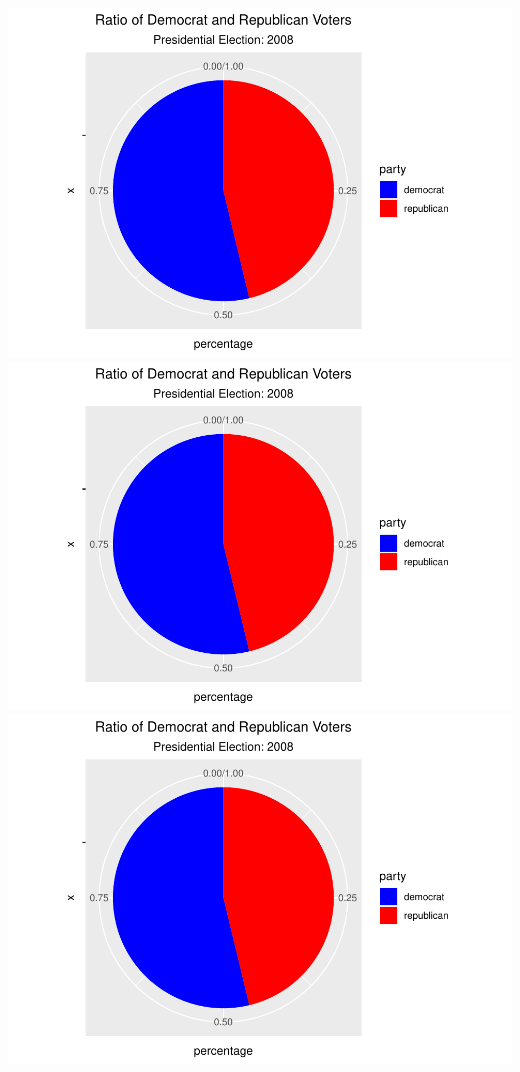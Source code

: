 \documentclass[
]{article}
\begin{document}
\includegraphics{election_files/figure-latex/anim-76.pdf}
\includegraphics{election_files/figure-latex/anim-77.pdf}
\includegraphics{election_files/figure-latex/anim-78.pdf}
\end{document}
